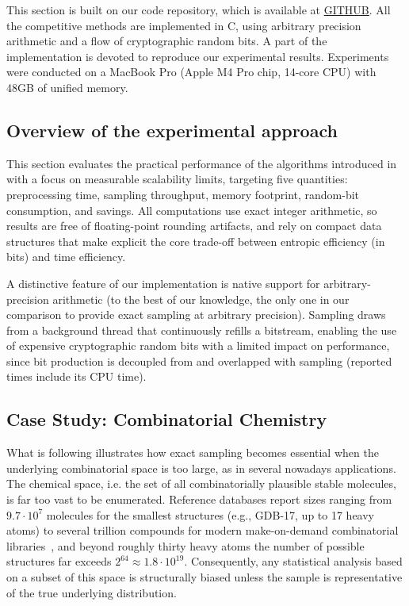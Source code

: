 
This section is built on our code repository, which is available at \textcolor{red}{\url{GITHUB}}.
All the competitive methods are implemented in C, using arbitrary precision arithmetic
and a flow of cryptographic random bits. A part of the implementation is devoted to reproduce our experimental results.
Experiments were conducted on a MacBook Pro (Apple M4 Pro chip, 14-core CPU) with 48GB of unified memory.


\subsection{Overview of the experimental approach}

This section evaluates the practical performance of the algorithms introduced in 
with a focus on measurable scalability limits, targeting five quantities: preprocessing time, sampling
throughput, memory footprint, random-bit consumption, and savings. All computations use exact integer
arithmetic, so results are free of floating-point rounding artifacts, and rely on compact data structures
that make explicit the core trade-off between entropic efficiency (in bits) and time efficiency.

A distinctive feature of our implementation is native support for arbitrary-precision arithmetic 
(to the best of our knowledge, the only one in our comparison to provide exact sampling at arbitrary
precision). Sampling draws from a background thread that continuously refills a bitstream, enabling the use
of expensive cryptographic random bits with a limited impact on performance, since bit
production is decoupled from and overlapped with sampling (reported times include its CPU time).



\subsection{Case Study: Combinatorial Chemistry}
\label{sec:chemie}

What is following illustrates how exact sampling becomes essential
when the underlying combinatorial space is too large, as in several nowadays applications.
The chemical space, i.e. the set of all combinatorially plausible stable
molecules, is far too vast to be enumerated. Reference databases report
sizes ranging from $9.7 \cdot 10^{7}$ molecules for the smallest
structures (e.g., GDB-17, up to 17 heavy atoms) to several trillion
compounds for modern make-on-demand combinatorial
libraries~\cite{SSHL26}, and beyond roughly thirty heavy atoms the
number of possible structures far exceeds $2^{64} \approx 1.8 \cdot
10^{19}$. Consequently, any statistical analysis based on a subset of this
space is structurally biased unless the sample is representative of the
true underlying distribution.

